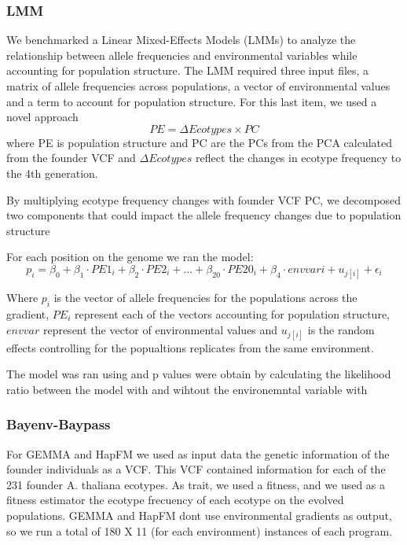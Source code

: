 \documentclass{article}
\begin{document}
\subsubsection{LMM}
We benchmarked a Linear Mixed-Effects Models (LMMs) to analyze the relationship between allele frequencies and environmental variables while accounting for population structure. The LMM required three input files, a matrix of allele frequencies across populations, a vector of environmental values and a term to account for population structure. For this last item, we used a novel approach 
\[
PE = \Delta Ecotypes \times PC 
\]
where PE is population structure and PC are the PCs from the PCA calculated from the founder VCF and $\Delta Ecotypes$ reflect the changes in ecotype frequency to the 4th generation. 

By multiplying ecotype frequency changes with founder VCF PC, we decomposed two components that could impact the allele frequency changes due to 
population structure

For each position on the genome we ran the model:
\begin{equation}
    p_{i} = \beta_{0} + \beta_{1} \cdot PE1_{i} + \beta_{2} \cdot PE2_{i} + ... + \beta_{20} \cdot PE20_{i} + \beta_{4} \cdot envvar{i} + u_{j[i]} + \epsilon_{i}
\end{equation}

Where $p_{i}$ is the vector of allele frequencies for the populations across the gradient, $PE_{i}$ represent each of the vectors accounting for population structure, $env var$ represent the vector of environmental values and $u_{j[i]}$ is the random effects controlling for the popualtions replicates from the same environment. 

The model was ran using \citep{lme4} and p values were obtain by calculating the likelihood ratio between the model with and wihtout the environemntal variable with \citep{lmerTest}

\subsubsection{Bayenv-Baypass}

For GEMMA and HapFM we used as input data the genetic information of the founder individuals as a VCF. This VCF contained information for each of the 231 founder A. thaliana ecotypes. As trait, we used a fitness, and we used as a fitness estimator the ecotype frecuency of each ecotype on the evolved populations. 
GEMMA and HapFM dont use environmental gradients as output, so we run a total of 180 X 11 (for each environment) instances of each program. 
\end{document}
